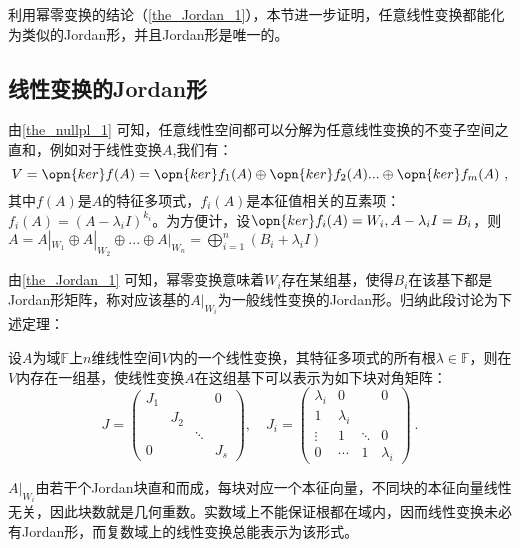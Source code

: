 

\begin{issues}
\issueTODO
\end{issues}

利用幂零变换的结论（\autoref{the_Jordan_1}），本节进一步证明，任意线性变换都能化为类似的Jordan形，并且Jordan形是唯一的。
\subsection{线性变换的Jordan形}
由\autoref{the_nullpl_1} 可知，任意线性空间都可以分解为任意线性变换的不变子空间之直和，例如对于线性变换$A$,我们有：
\begin{equation}
V=\opn{ker}f(A)=\opn{ker}f_1(A)\oplus\opn{ker}f_2(A)...\oplus\opn{ker}f_m(A)~,
\end{equation}
其中$f(A)$是$A$的特征多项式，$f_i(A)$是本征值相关的互素项：$f_i(A)=(A-\lambda_iI)^{k_i}$。为方便计，设$\opn{ker}f_i(A)=W_i,A-\lambda_iI=B_i$，则$A=A|_{W_1}\oplus A|_{W_2}\oplus...\oplus A|_{W_n}=\bigoplus^n_{i=1}(B_i+\lambda_iI)$

由\autoref{the_Jordan_1} 可知，幂零变换意味着$W_i$存在某组基，使得$B_i$在该基下都是Jordan形矩阵，称对应该基的$A|_{W_i}$为一般线性变换的Jordan形。归纳此段讨论为下述定理：
\begin{theorem}{}\label{the_ltrJor_1}
设$A$为域$\mathbb F$上$n$维线性空间$V$内的一个线性变换，其特征多项式的所有根$\lambda\in\mathbb F$，则在$V$内存在一组基，使线性变换$A$在这组基下可以表示为如下块对角矩阵：
\begin{equation}
J=\left(\begin{array}{cccc}
J_1 & & & 0 \\
& J_2 & & \\
& & \ddots & \\
0 & & & J_s
\end{array}\right), \quad J_i=\left(\begin{array}{cccc}
\lambda_i & 0 & & 0 \\
1& \lambda_i &  & \\
\vdots& 1& \ddots & 0 \\
0 &\cdots &1 & \lambda_i
\end{array}\right)~.
\end{equation}
\end{theorem}
$A|_{W_i}$由若干个Jordan块直和而成，每块对应一个本征向量，不同块的本征向量线性无关，因此块数就是几何重数。实数域上不能保证根都在域内，因而线性变换未必有Jordan形，而复数域上的线性变换总能表示为该形式。


